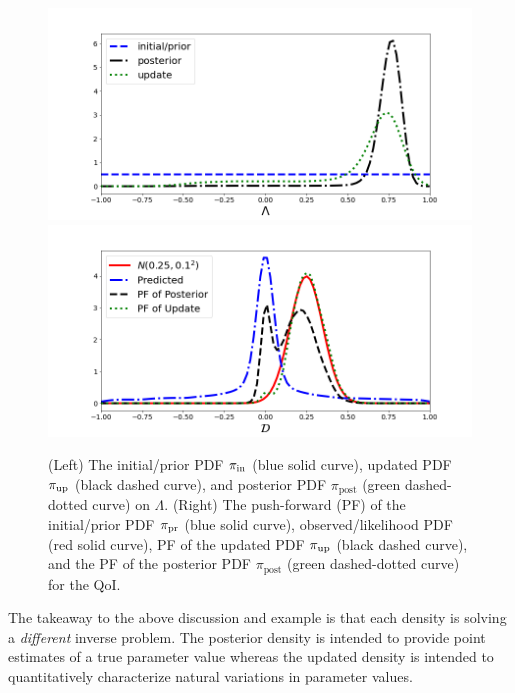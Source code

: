 \begin{ex}
\begin{figure}[htbp]
\centering
   \includegraphics[width=0.49\linewidth]{figures/bip-vs-sip-1.png}
   \includegraphics[width=0.49\linewidth]{figures/bip-vs-sip-pf-1.png}
 \caption{(Left) The initial/prior PDF $\operatorname*{\pi_{in}}$ (blue solid curve), updated PDF $\operatorname*{\pi_{up}}$ (black dashed curve), and posterior PDF $\pi_\text{post}$ (green dashed-dotted curve) on $\Lambda$.
 (Right) The push-forward (PF) of the initial/prior PDF $\operatorname*{\pi_{pr}}$ (blue solid curve), observed/likelihood PDF (red solid curve), PF of the updated PDF $\operatorname*{\pi_{up}}$ (black dashed curve), and the PF of the posterior PDF $\pi_\text{post}$ (green dashed-dotted curve) for the QoI.}
 \label{fig:bayes-comparison}
\end{figure}

The takeaway to the above discussion and example is that each density is solving a {\em different} inverse problem.
The posterior density is intended to provide point estimates of a true parameter value whereas the updated density is intended to quantitatively characterize natural variations in parameter values.

\end{ex}

